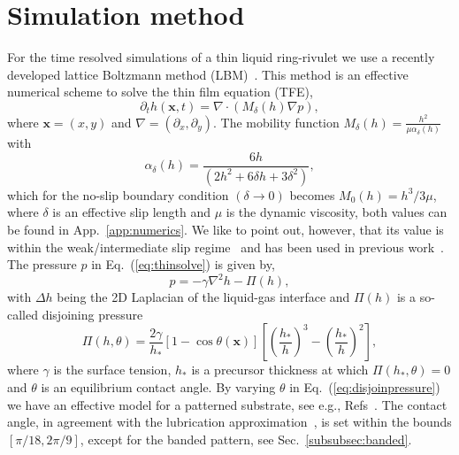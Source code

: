 \documentclass[twoside,twocolumn,9pt]{article}
\begin{document}
\section{Simulation method}
\label{sec:method}
For the time resolved simulations of a thin liquid ring-rivulet we use a recently developed lattice Boltzmann method (LBM)~\cite{zitzLatticeBoltzmannMethod2019, zitzLatticeBoltzmannSimulations2021, zitzSwalbeJlLattice2022, zitzControllingDewettingMorphologies2023}. 
This method is an effective numerical scheme to solve the thin film equation (TFE),  
\begin{equation}\label{eq:thinsolve}
     \partial_t h(\mathbf{x},t) = \nabla\cdot\left(M_{\delta}(h)\nabla p\right),
\end{equation}
where $\mathbf{x} = (x,y)$ and $\nabla = (\partial_x, \partial_y)$.
The mobility function $M_{\delta}(h) = \frac{h^2}{\mu\alpha_{\delta}(h)}$ with 
\begin{equation}\label{eq:alphafric}
    \alpha_{\delta}(h) = \frac{6h}{(2 h^2 + 6 \delta h + 3 \delta^2)},
\end{equation}
which for the no-slip boundary condition $(\delta \rightarrow 0)$ becomes $M_{0}(h) = h^3/3\mu$, where $\delta$ is an effective slip length and $\mu$ is the dynamic viscosity, both values can be found in App.~\ref{app:numerics}.
We like to point out, however, that its value is within the weak/intermediate slip regime~\cite{peschkaSignaturesSlipDewetting2019,fetzerQuantifyingHydrodynamicSlip2007, munchLubricationModelsSmall2005} and has been used in previous work~\cite{zitzControllingDewettingMorphologies2023}.
The pressure $p$ in Eq.~(\ref{eq:thinsolve}) is given by,
\begin{equation}\label{eq:filmpressure}
    p = - \gamma\nabla^2 h -\Pi(h),
\end{equation}
with $\Delta h$ being the 2D Laplacian of the liquid-gas interface and $\Pi(h)$ is a so-called disjoining pressure~\cite{schwartzSimulationDropletMotion1998, crasterDynamicsStabilityThin2009, nguyenCompetitionCollapseBreakup2012, gonzalezStabilityLiquidRing2013}
\begin{equation}\label{eq:disjoinpressure}
    \Pi(h,\theta) = \frac{2\gamma}{h_{\ast}}[1-\cos\theta(\mathbf{x})]\left[\left(\frac{h_*}{h}\right)^3 -\left(\frac{h_*}{h}\right)^2\right],
\end{equation}
where $\gamma$ is the surface tension, $h_{\ast}$ is a precursor thickness at which $\Pi(h_{\ast}, \theta) = 0$ and $\theta$ is an equilibrium contact angle.
By varying $\theta$ in Eq.~(\ref{eq:disjoinpressure}) we have an effective model for a patterned substrate, see e.g., Refs~\cite{zitzLatticeBoltzmannSimulations2021, zitzControllingDewettingMorphologies2023}. 
The contact angle, in agreement with the lubrication approximation~\cite{oronLongscaleEvolutionThin1997}, is set within the bounds $[\pi/18, 2\pi/9]$, except for the banded pattern, see Sec.~\ref{subsubsec:banded}. 
\end{document}
